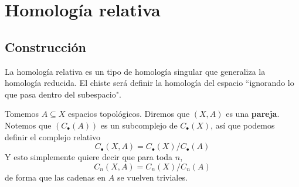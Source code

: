 \documentclass[spanish]{book}
\theoremstyle{definition}
\begin{document}
\section{Homología relativa}
\subsection{Construcción}

	La homología relativa es un tipo de homología singular que generaliza la homología reducida. El chiste será definir la homología del espacio ``ignorando lo que pasa dentro del subespacio".
	
	Tomemos $A\subseteq X$ espacios topológicos. Diremos que $(X,A)$ es una \textbf{pareja}. Notemos que $(C_\bullet(A))$ es un subcomplejo de $C_\bullet (X)$, así que podemos definir el complejo relativo
	\[
	C_\bullet(X,A)=C_\bullet(X)/C_\bullet(A)
	\]
	Y esto simplemente quiere decir que para toda $n$,
	\[
	C_n(X,A)=C_n(X)/C_n(A)
	\]
	de forma que las cadenas en $A$ se vuelven triviales.
	
\end{document}
